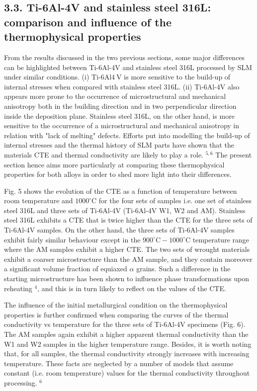 \documentclass[10pt]{article}
\begin{document}
\subsection*{3.3. Ti-6Al-4V and stainless steel 316L: comparison and influence of the thermophysical properties}
From the results discussed in the two previous sections, some major differences can be highlighted between Ti-6Al-4V and stainless steel 316L processed by SLM under similar conditions. (i) Ti-6Al$4 \mathrm{~V}$ is more sensitive to the build-up of internal stresses when compared with stainless steel 316L. (ii) Ti-6Al-4V also appears more prone to the occurrence of microstructural and mechanical anisotropy both in the building direction and in two perpendicular direction inside the deposition plane. Stainless steel 316L, on the other hand, is more sensitive to the occurrence of a microstructural and mechanical anisotropy in relation with "lack of melting" defects. Efforts put into modelling the build-up of internal stresses and the thermal history of SLM parts have shown that the materials CTE and thermal conductivity are likely to play a role. ${ }^{5,6}$ The present section hence aims more particularly at comparing these thermophysical properties for both alloys in order to shed more light into their differences.

Fig. 5 shows the evolution of the CTE as a function of temperature between room temperature and $1000^{\circ} \mathrm{C}$ for the four sets of samples i.e. one set of stainless steel 316L and three sets of Ti-6Al-4V (Ti-6Al-4V W1, W2 and AM). Stainless steel 316L exhibits a CTE that is twice higher than the CTE for the three sets of Ti-6Al-4V samples. On the other hand, the three sets of Ti-6Al-4V samples exhibit fairly similar behaviour except in the $900^{\circ} \mathrm{C}-1000^{\circ} \mathrm{C}$ temperature range where the $\mathrm{AM}$ samples exhibit a higher CTE. The two sets of wrought materials exhibit a coarser microstructure than the AM sample, and they contain moreover a significant volume fraction of equiaxed $\alpha$ grains. Such a difference in the starting microstructure has been shown to influence phase transformations upon reheating ${ }^{4}$, and this is in turn likely to reflect on the values of the CTE.

The influence of the initial metallurgical condition on the thermophysical properties is further confirmed when comparing the curves of the thermal conductivity vs temperature for the three sets of Ti-6Al-4V specimens (Fig. 6). The AM samples again exhibit a higher apparent thermal conductivity than the W1 and W2 samples in the higher temperature range. Besides, it is worth noting that, for all samples, the thermal conductivity strongly increases with increasing temperature. These facts are neglected by a number of models that assume constant (i.e. room temperature) values for the thermal conductivity throughout processing. ${ }^{6}$
\end{document}
